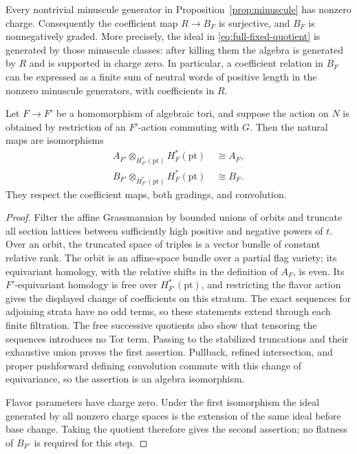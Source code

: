 Every nontrivial minuscule generator in Proposition~\ref{prop:minuscule} has nonzero
charge.  Consequently the coefficient map $R\to B_F$ is surjective,
and $B_F$ is nonnegatively graded.  More precisely, the ideal in
\eqref{eq:full-fixed-quotient} is generated by those minuscule classes:
after killing them the algebra is generated by $R$ and is supported in
charge zero.  In particular, a coefficient relation in $B_F$ can be
expressed as a finite sum of neutral words of positive length in the
nonzero minuscule generators, with coefficients in $R$.

\begin{lemma}\label{lem:flavor-base-change}
Let $F\to F'$ be a homomorphism of algebraic tori, and suppose the action
on $N$ is obtained by restriction of an $F'$-action commuting with $G$.
Then the natural maps are isomorphisms
\begin{align*}
 A_{F'}\otimes_{H_{F'}^*(\mathrm{pt})}H_F^*(\mathrm{pt})&\ \cong A_F,\\
 B_{F'}\otimes_{H_{F'}^*(\mathrm{pt})}H_F^*(\mathrm{pt})&\ \cong B_F.
\end{align*}
They respect the coefficient maps, both gradings, and convolution.
\end{lemma}

\begin{proof}
Filter the affine Grassmannian by bounded unions of orbits and truncate
all section lattices between sufficiently high positive and negative
powers of $t$.  Over an orbit, the truncated space of triples is a
vector bundle of constant relative rank.  The orbit is an affine-space
bundle over a partial flag variety; its equivariant homology, with the
relative shifts in the definition of $A_F$, is even.  Its $F'$-equivariant
homology is free over $H_{F'}^*(\mathrm{pt})$, and restricting the flavor
action gives the displayed change of coefficients on this stratum.
The exact sequences for adjoining strata have no odd terms, so these
statements extend through each finite filtration.  The free successive
quotients also show that tensoring the sequences introduces no Tor term.
Passing to the stabilized truncations and their exhaustive union proves
the first assertion.  Pullback, refined intersection, and proper
pushforward defining convolution commute with this change of
equivariance, so the assertion is an algebra isomorphism.

Flavor parameters have charge zero.  Under the first isomorphism the
ideal generated by all nonzero charge spaces is the extension of the
same ideal before base change.  Taking the quotient therefore gives
the second assertion; no flatness of $B_{F'}$ is required for this step.
\end{proof}

